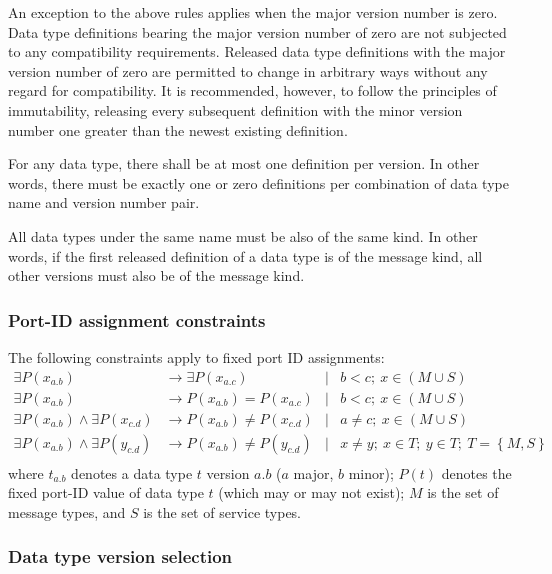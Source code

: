 An exception to the above rules applies when the major version number is zero.
Data type definitions bearing the major version number of zero are not subjected to any compatibility requirements.
Released data type definitions with the major version number of zero are permitted to change in arbitrary
ways without any regard for compatibility.
It is recommended, however, to follow the principles of immutability, releasing every subsequent definition
with the minor version number one greater than the newest existing definition.

For any data type, there shall be at most one definition per version.
In other words, there must be exactly one or zero definitions
per combination of data type name and version number pair.

All data types under the same name must be also of the same kind.
In other words, if the first released definition of a data type is of the message kind,
all other versions must also be of the message kind.

\subsubsection{Port-ID assignment constraints}

The following constraints apply to fixed port ID assignments:
\begin{align*}
    \exists P(x_{a.b})                          &\rightarrow \exists P(x_{a.c})
    &\mid& b < c;\ x \in (M \cup S) \\
    \exists P(x_{a.b})                          &\rightarrow         P(x_{a.b}) =    P(x_{a.c})
    &\mid& b < c;\ x \in (M \cup S) \\
    \exists P(x_{a.b}) \land \exists P(x_{c.d}) &\rightarrow         P(x_{a.b}) \neq P(x_{c.d})
    &\mid& a \neq c;\ x \in (M \cup S) \\
    \exists P(x_{a.b}) \land \exists P(y_{c.d}) &\rightarrow         P(x_{a.b}) \neq P(y_{c.d})
    &\mid& x \neq y;\ x \in T;\ y \in T;\ T = \left\{ M, S \right\} \\
\end{align*}
where $t_{a.b}$ denotes a data type $t$ version $a.b$ ($a$ major, $b$ minor);
$P(t)$ denotes the fixed port-ID value of data type $t$ (which may or may not exist);
$M$ is the set of message types, and $S$ is the set of service types.

\subsubsection{Data type version selection}

